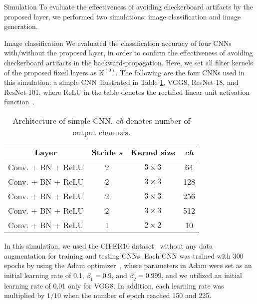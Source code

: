\documentclass{article}
\makeatletter
\renewcommand\section{\@startsection{section}{1}{\z@}
                      {0.5ex \@plus 0ex \@minus -2ex}
                      {0.5ex \@plus 0ex}
                      {\normalfont\Large\bfseries}}
\renewcommand\subsection{\@startsection{subsection}{2}{\z@}
                      {0.5ex \@plus 0ex \@minus -2ex}
                      {0.5ex \@plus 0ex}
                      {\normalfont\large\bfseries}}
\newcommand{\mytensor}[1]{\boldsymbol{\mathrm{#1}}}
\newcounter{num}
\makeatother
\begin{document}
\section{Simulation}
  To evaluate the effectiveness of avoiding checkerboard artifacts by the proposed layer,
  we performed two simulations: image classification and image generation.

\subsection{Image classification}
  We evaluated the classification accuracy of four CNNs with/without
  the proposed layer,
  in order to confirm the effectiveness of avoiding checkerboard artifacts in
  the backward-propagation.
  Here, we set all filter kernels of the proposed fixed layers as $\mytensor{K}^{(0)}$.
  The following are the four CNNs used in this simulation:
  a simple CNN illustrated in Table \ref{tab:simple_cnn}, VGG8, ResNet-18, and ResNet-101,
  where ReLU in the table denotes
  the rectified linear unit activation function~\cite{glorot2011deep}.
  \begin{table}[!t]
    \centering
    \footnotesize
    \caption{Architecture of simple CNN.
      \textit{ch} denotes number of output channels.}
    \begin{tabular}{cccc} \hline\hline
      Layer & Stride $s$ & Kernel size & \textit{ch} \\ \hline
      Conv. + BN + ReLU & 2 & $3 \times 3$ & 64 \\
      Conv. + BN + ReLU & 2 & $3 \times 3$ & 128 \\
      Conv. + BN + ReLU & 2 & $3 \times 3$ & 256 \\
      Conv. + BN + ReLU & 2 & $3 \times 3$ & 512 \\
      Conv. + BN + ReLU & 1 & $2 \times 2$ & 10 \\
      \hline
    \end{tabular}
    \label{tab:simple_cnn}
  \end{table}
  In this simulation,
  we used the CIFER10 dataset~\cite{krizhevsky2009learning}
  without any data augmentation
  for training and testing CNNs.
  Each CNN was trained with 300 epochs by using the Adam optimizer~\cite{kingma2014adam},
  where parameters in Adam were set as an initial learning rate of 0.1,
  $\beta_1=0.9$, and $\beta_2=0.999$,
  and we utilized an initial learning rate of 0.01 only for VGG8.
  In addition, each learning rate was multiplied by $1/10$
  when the number of epoch reached 150 and 225.
\end{document}
